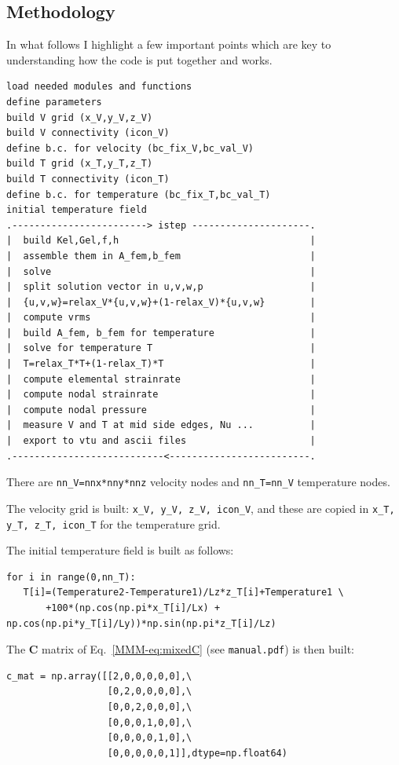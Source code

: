 \subsection*{Methodology}

In what follows I highlight a few important points which are key to understanding how the code
is put together and works. 

\begin{verbatim}
load needed modules and functions
define parameters
build V grid (x_V,y_V,z_V)
build V connectivity (icon_V)
define b.c. for velocity (bc_fix_V,bc_val_V)
build T grid (x_T,y_T,z_T)
build T connectivity (icon_T)
define b.c. for temperature (bc_fix_T,bc_val_T)
initial temperature field
.------------------------> istep ---------------------.
|  build Kel,Gel,f,h                                  |
|  assemble them in A_fem,b_fem                       |
|  solve                                              |
|  split solution vector in u,v,w,p                   |
|  {u,v,w}=relax_V*{u,v,w}+(1-relax_V)*{u,v,w}        |
|  compute vrms                                       |
|  build A_fem, b_fem for temperature                 |
|  solve for temperature T                            |
|  T=relax_T*T+(1-relax_T)*T                          |
|  compute elemental strainrate                       |
|  compute nodal strainrate                           |
|  compute nodal pressure                             |
|  measure V and T at mid side edges, Nu ...          |
|  export to vtu and ascii files                      | 
.---------------------------<-------------------------.
\end{verbatim}

There are \lstinline{nn_V=nnx*nny*nnz} velocity nodes and 
\lstinline{nn_T=nn_V} temperature nodes.

The velocity grid is built: \lstinline{x_V, y_V, z_V, icon_V}, and 
these are copied in \lstinline{x_T, y_T, z_T, icon_T} for the temperature grid.  

The initial temperature field is built as follows:
\begin{lstlisting}
for i in range(0,nn_T):
   T[i]=(Temperature2-Temperature1)/Lz*z_T[i]+Temperature1 \
       +100*(np.cos(np.pi*x_T[i]/Lx) + np.cos(np.pi*y_T[i]/Ly))*np.sin(np.pi*z_T[i]/Lz)
\end{lstlisting}

The ${\bm C}$ matrix of Eq.~\eqref{MMM-eq:mixedC} (see {\tt manual.pdf}) is then built:
\begin{lstlisting}
c_mat = np.array([[2,0,0,0,0,0],\
                  [0,2,0,0,0,0],\
                  [0,0,2,0,0,0],\
                  [0,0,0,1,0,0],\
                  [0,0,0,0,1,0],\
                  [0,0,0,0,0,1]],dtype=np.float64) 
\end{lstlisting}

